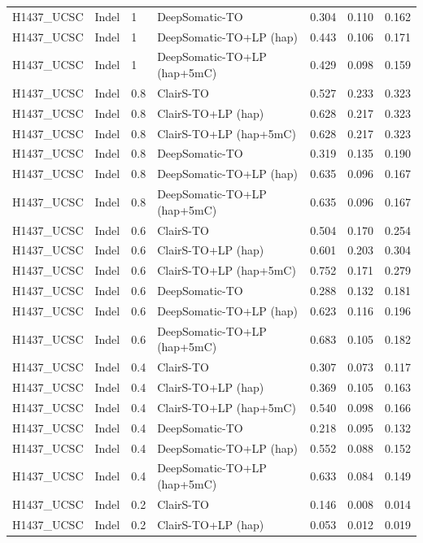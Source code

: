 \documentclass[pdflatex,sn-nature]{sn-jnl}
\begin{document}
{\begin{longtable}{@{}llllccc@{}}
  H1437\_UCSC & Indel & 1 & DeepSomatic-TO & 0.304 & 0.110 & 0.162 \\
  H1437\_UCSC & Indel & 1 & DeepSomatic-TO+LP (hap) & 0.443 & 0.106 & 0.171 \\
  H1437\_UCSC & Indel & 1 & DeepSomatic-TO+LP (hap+5mC) & 0.429 & 0.098 & 0.159 \\
  H1437\_UCSC & Indel & 0.8 & ClairS-TO & 0.527 & 0.233 & 0.323 \\
  H1437\_UCSC & Indel & 0.8 & ClairS-TO+LP (hap) & 0.628 & 0.217 & 0.323 \\
  H1437\_UCSC & Indel & 0.8 & ClairS-TO+LP (hap+5mC) & 0.628 & 0.217 & 0.323 \\
  H1437\_UCSC & Indel & 0.8 & DeepSomatic-TO & 0.319 & 0.135 & 0.190 \\
  H1437\_UCSC & Indel & 0.8 & DeepSomatic-TO+LP (hap) & 0.635 & 0.096 & 0.167 \\
  H1437\_UCSC & Indel & 0.8 & DeepSomatic-TO+LP (hap+5mC) & 0.635 & 0.096 & 0.167 \\
  H1437\_UCSC & Indel & 0.6 & ClairS-TO & 0.504 & 0.170 & 0.254 \\
  H1437\_UCSC & Indel & 0.6 & ClairS-TO+LP (hap) & 0.601 & 0.203 & 0.304 \\
  H1437\_UCSC & Indel & 0.6 & ClairS-TO+LP (hap+5mC) & 0.752 & 0.171 & 0.279 \\
  H1437\_UCSC & Indel & 0.6 & DeepSomatic-TO & 0.288 & 0.132 & 0.181 \\
  H1437\_UCSC & Indel & 0.6 & DeepSomatic-TO+LP (hap) & 0.623 & 0.116 & 0.196 \\
  H1437\_UCSC & Indel & 0.6 & DeepSomatic-TO+LP (hap+5mC) & 0.683 & 0.105 & 0.182 \\
  H1437\_UCSC & Indel & 0.4 & ClairS-TO & 0.307 & 0.073 & 0.117 \\
  H1437\_UCSC & Indel & 0.4 & ClairS-TO+LP (hap) & 0.369 & 0.105 & 0.163 \\
  H1437\_UCSC & Indel & 0.4 & ClairS-TO+LP (hap+5mC) & 0.540 & 0.098 & 0.166 \\
  H1437\_UCSC & Indel & 0.4 & DeepSomatic-TO & 0.218 & 0.095 & 0.132 \\
  H1437\_UCSC & Indel & 0.4 & DeepSomatic-TO+LP (hap) & 0.552 & 0.088 & 0.152 \\
  H1437\_UCSC & Indel & 0.4 & DeepSomatic-TO+LP (hap+5mC) & 0.633 & 0.084 & 0.149 \\
  H1437\_UCSC & Indel & 0.2 & ClairS-TO & 0.146 & 0.008 & 0.014 \\
  H1437\_UCSC & Indel & 0.2 & ClairS-TO+LP (hap) & 0.053 & 0.012 & 0.019 \\

\end{longtable}}
\end{document}
